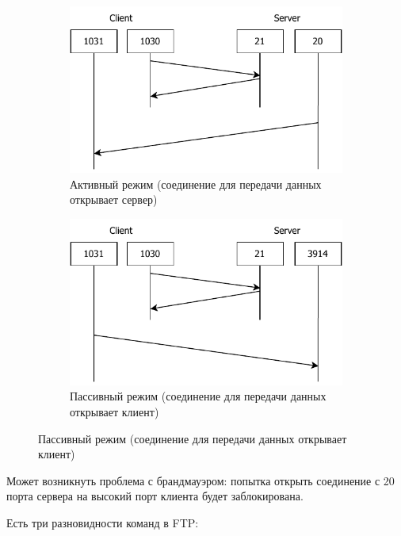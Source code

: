 \begin{figure}[H]
    \centering
    \begin{subfigure}{0.45\textwidth}
        \includegraphics[width=\textwidth]{12/notes/inc/ftp-active}
        \caption{Активный режим (соединение для передачи данных открывает сервер)}
    \end{subfigure}
    \hspace{.5cm}
    \begin{subfigure}{0.45\textwidth}
        \includegraphics[width=\textwidth]{12/notes/inc/ftp-passive}
        \caption{Пассивный режим (соединение для передачи данных открывает клиент)}
    \end{subfigure}
\end{figure}

Может возникнуть проблема с брандмауэром: попытка открыть соединение с 20 порта сервера на высокий порт клиента будет заблокирована.

Есть три разновидности команд в FTP:


